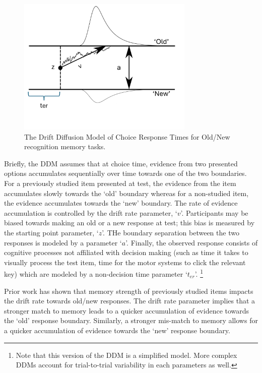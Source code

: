 \begin{figure}[ht]
    \label{fig:ddm-model}
    \centering
    \includegraphics[width = 0.75\textwidth]{chapter_notebooks/chapter_3/figures/ddm.png}
    \caption{The Drift Diffusion Model of Choice Response Times for Old/New recognition memory tasks.}
\end{figure}

Briefly, the DDM assumes that at choice time, evidence from two presented options accumulates sequentially over time towards one of the two boundaries. For a previously studied item presented at test, the evidence from the item accumulates slowly towards the `old' boundary whereas for a non-studied item, the evidence accumulates towards the `new' boundary. The rate of evidence accumulation is controlled by the drift rate parameter, `$v$'. Participants may be biased towards making an old or a new response at test; this bias is measured by the starting point parameter, `$z$'. THe boundary separation between the two responses is modeled by a parameter `$a$'. Finally, the observed response consists of cognitive processes not affiliated with decision making (such as time it takes to visually process the test item, time for the motor systems to click the relevant key) which are modeled by a non-decision time parameter `$t_{er}$'. \footnote{Note that this version of the DDM is a simplified model. More complex DDMs account for trial-to-trial variability in each parameters as well.} 

Prior work has shown that memory strength of previously studied items impacts the drift rate towards old/new responses. The drift rate parameter implies that a stronger match to memory leads to a quicker accumulation of evidence towards the `old' response boundary. Similarly, a stronger mis-match to memory allows for a quicker accumulation of evidence towards the `new' response boundary\cite{ratcliff2004diffusion,ratcliff2022discriminating}. 

